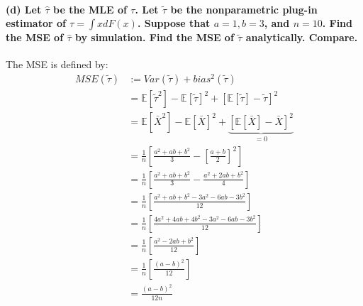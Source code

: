 \documentclass{article}
\newcommand{\E}{\mathbb{E}}
\begin{document}
\paragraph{(d) Let $\hat{\tau}$ be the MLE of $\tau$. Let $\widetilde{\tau}$ be the nonparametric plug-in estimator of $\tau=\int x d F(x)$. Suppose that $a=1, b=3$, and $n=10$. Find the MSE of $\hat{\tau}$ by simulation. Find the MSE of $\widetilde{\tau}$ analytically. Compare.\\}
The MSE is defined by:
\begin{align*}
    MSE (\tilde \tau)
     & := Var(\tilde\tau)   + bias^2 (\tilde \tau)                                          \\
     & = \E[\tilde\tau^2] - \E[\tilde\tau]^2 + \left[\E[\tilde\tau] - \tilde\tau\right]^2   \\
     & = \E[\bar X^2] - \E[\bar X]^2 + \underbrace{\left[\E[\bar X] - \bar X\right]^2}_{=0} \\
     & = \frac{1}{n}\left[\frac{a^2 + ab + b^2}{3} - \left[\frac{a+b}{2}\right]^2\right]    \\
     & = \frac{1}{n}\left[\frac{a^2 + ab + b^2}{3} - \frac{a^2 + 2ab + b^2}{4}\right]       \\
     & = \frac{1}{n}\left[\frac{a^2 + ab + b^2 - 3a^2 - 6ab - 3b^2}{12}\right]              \\
     & = \frac{1}{n}\left[\frac{4a^2 + 4ab + 4b^2 - 3a^2 - 6ab - 3b^2}{12}\right]           \\
     & = \frac{1}{n}\left[\frac{a^2 -2ab + b^2}{12}\right]                                  \\
     & = \frac{1}{n}\left[\frac{(a-b)^2}{12}\right]                                         \\
     & = \frac{(a-b)^2}{12n}                                                                \\
\end{align*}
\end{document}
